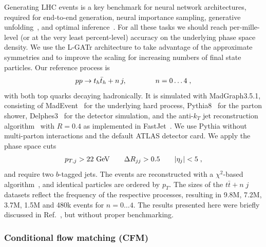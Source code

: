 \documentclass[submission, Phys]{SciPost}
\begin{document}
Generating LHC events is a key benchmark for neural network architectures, required for end-to-end generation, neural importance sampling, generative unfolding~\cite{Bellagente:2019uyp,Bellagente:2020piv,Backes:2022sph,Shmakov:2023kjj,Diefenbacher:2023wec,Huetsch:2024quz}, and optimal inference~\cite{Butter:2022vkj,Heimel:2023mvw}. For all these tasks we should reach per-mille-level (or at the very least percent-level) accuracy on the underlying phase space density. We use the L-GATr architecture to take advantage of the approximate symmetries and to improve the scaling for increasing numbers of final state particles. Our reference process is 
%
\begin{align}
    pp\to t_h \bar t_h + n\, j , 
    \qquad\qquad n=0\dots 4 \; ,
\end{align}
%
with both top quarks decaying hadronically. It is simulated with MadGraph3.5.1, consisting of MadEvent~\cite{Alwall:2011uj} for the underlying hard process, Pythia8~\cite{Sjostrand:2014zea} for the parton shower, Delphes3~\cite{deFavereau:2013fsa} for the detector simulation, and the anti-$k_T$ jet reconstruction algorithm~\cite{Cacciari:2008gp} with $R=0.4$ as implemented in FastJet~\cite{Cacciari:2011ma}. We use Pythia without multi-parton interactions and the default ATLAS detector card. We apply the phase space cuts
%
\begin{align}
 p_{T,j} > 22~\text{GeV} 
 \qquad 
 \Delta R_{jj} > 0.5 
 \qquad |\eta_j| < 5 \; ,
\end{align} 
and require two $b$-tagged jets. The events are reconstructed with a $\chi^2$-based algorithm~\cite{ATLAS:2020ccu}, and identical particles are ordered by $p_T$. The sizes of the $t\bar t+n\; j$ datasets reflect the frequency of the respective processes, resulting in 9.8M, 7.2M, 3.7M, 1.5M and 480k events for $n=0 \ldots 4$. The results presented here were briefly discussed in Ref.~\cite{Spinner:2024hjm}, but without proper benchmarking.

\subsubsection*{Conditional flow matching (CFM)}
\end{document}

